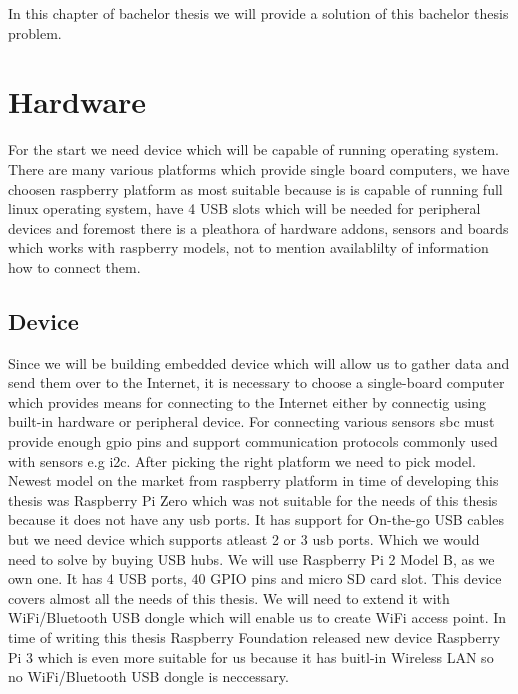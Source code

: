 In this chapter of bachelor thesis we will provide a solution of this bachelor thesis problem.
\section{Hardware}
For the start we need device which will be capable of running operating system. There are many various platforms which provide single board computers, we have choosen raspberry platform as most suitable because is is capable of running full linux operating system, have 4 USB slots which will be needed for peripheral devices and foremost there is a pleathora of hardware addons, sensors and boards which works with raspberry models, not to mention availablilty of information how to connect them.
\subsection{Device}
Since we will be building embedded device which will allow us to gather data and send them over to the Internet, it is necessary to choose a single-board computer which provides means for connecting to the Internet either by connectig using built-in hardware or peripheral device. For connecting various sensors \gls{sbc} must provide enough \gls{gpio} pins and support communication protocols commonly used with sensors e.g \gls{i2c}.
After picking the right platform we need to pick model. Newest model on the market from raspberry platform in time of developing this thesis was Raspberry Pi Zero which was not suitable for the needs of this thesis because it does not have any usb ports. It has support for On-the-go USB cables but we need device which supports atleast 2 or 3 usb ports. Which we would need to solve by buying USB hubs. We will use Raspberry Pi 2 Model B, as we own one. It has 4 USB ports, 40 GPIO pins and micro SD card slot. This device covers almost all the needs of this thesis. We will need to extend it with WiFi/Bluetooth USB dongle which will enable us to create WiFi access point. In time of writing this thesis Raspberry Foundation released new device Raspberry Pi 3 which is even more suitable for us because it has buitl-in Wireless LAN so no WiFi/Bluetooth USB dongle is neccessary.
